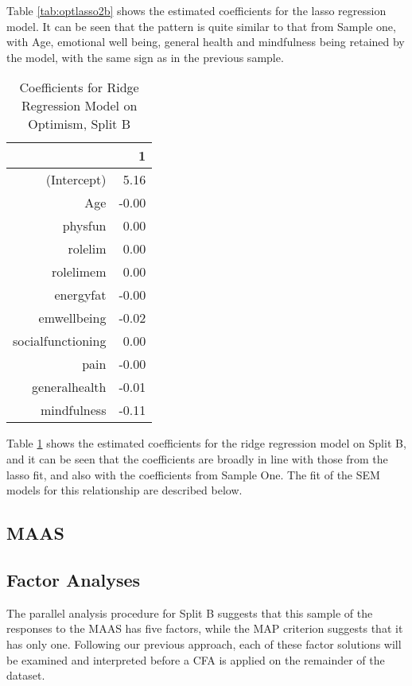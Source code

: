 \documentclass{article}
\begin{document}
Table \ref{tab:optlasso2b} shows the estimated coefficients for the lasso regression model. It can be seen that the pattern is quite similar to that from Sample one, with Age, emotional well being, general health and mindfulness being retained by the model, with the same sign as in the previous sample. 


\begin{table}[ht]
\centering
\begin{tabular}{rr}
  \hline
 & 1 \\ 
  \hline
(Intercept) & 5.16 \\ 
  Age & -0.00 \\ 
  physfun & 0.00 \\ 
  rolelim & 0.00 \\ 
  rolelimem & 0.00 \\ 
  energyfat & -0.00 \\ 
  emwellbeing & -0.02 \\ 
  socialfunctioning & 0.00 \\ 
  pain & -0.00 \\ 
  generalhealth & -0.01 \\ 
  mindfulness & -0.11 \\ 
   \hline
\end{tabular}
\caption{Coefficients for Ridge Regression Model on Optimism, Split B} 
\label{tab:optridge2b}
\end{table}
Table \ref{tab:optridge2b} shows the estimated coefficients for the ridge regression model on Split B, and it can be seen that the coefficients are broadly in line with those from the lasso fit, and also with the coefficients from Sample One. The fit of the SEM models for this relationship are described below. 



\subsection{MAAS}
\label{sec:maas-samp-two}

\subsection{Factor Analyses}
\label{sec:fact-maas}


The parallel analysis procedure for Split B suggests that this sample of the responses to the MAAS has five factors, while the MAP criterion suggests that it has only one.  Following our previous approach, each of these factor solutions will be examined and interpreted before a CFA is applied on the remainder of the dataset.
\end{document}
